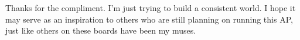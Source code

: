 Thanks for the compliment. I'm just trying to build a consistent world. I hope it may serve as an inspiration to others who are still planning on running this AP, just like others on these boards have been my muses.\\

